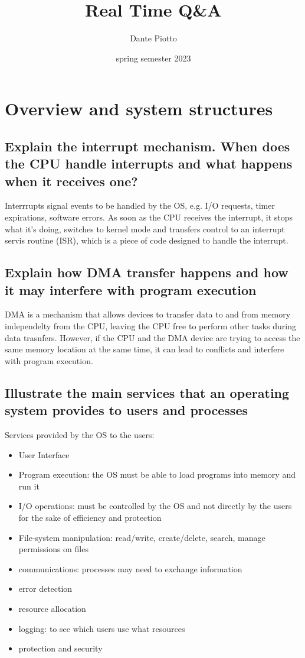 \documentclass{article}
\title{Real Time Q\&A}
\author{Dante Piotto}
\date{spring semester 2023}
\begin{document}
\maketitle
\tableofcontents

\section{Overview and system structures}

\subsection{Explain the interrupt mechanism. When does the CPU handle interrupts and what happens when it receives one?}
Interrrupts signal events to be handled by the OS, e.g. I/O requests, timer expirations, software errors. As soon as the CPU receives the interrupt, it stops what it's doing, switches to kernel mode and transfers control to an interrupt servis routine (ISR), which is a piece of code designed to handle the interrupt.

\subsection{Explain how DMA transfer happens and how it may interfere with program execution}
DMA is a mechanism that allows devices to transfer data to and from memory independelty from the CPU, leaving the CPU free to perform other tasks during data trasnfers. However, if the CPU and the DMA device are trying to access the same memory location at the same time, it can lead to conflicts and interfere with program execution.


\subsection{Illustrate the main services that an operating system provides to users and processes}
Services provided by the OS to the users:
\begin{itemize}
    \item User Interface
    \item Program execution: the OS must be able to load programs into memory and run it
    \item I/O operations: must be controlled by the OS and not directly by the users for the sake of efficiency and protection
    \item File-system manipulation: read/write, create/delete, search, manage permissions on files
    \item communications: processes may need to exchange information
    \item error detection
    \item resource allocation
    \item logging: to see which users use what resources
    \item protection and security
\end{itemize}
\end{document}
